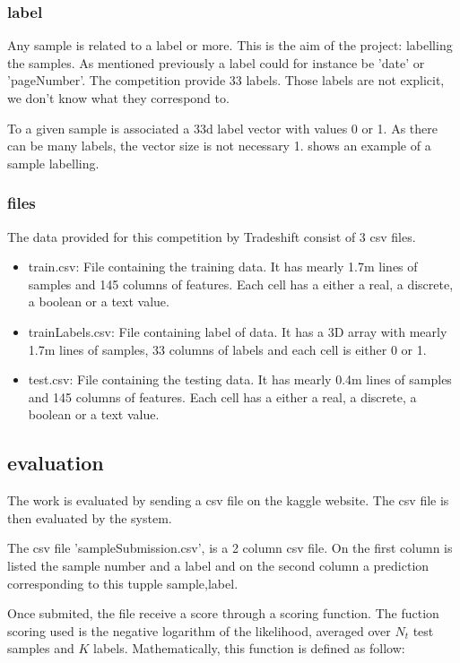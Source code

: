 		\subsubsection{label}
			Any sample is related to a label or more. This is the aim of the project: labelling the samples. As mentioned previously a label could for instance be 'date' or 'pageNumber'. The competition provide 33 labels. Those labels are not explicit, we don't know what they correspond to.

			To a given sample is associated a 33d label vector with values 0 or 1. As there can be many labels, the vector size is not necessary 1.  shows an example of a sample labelling.


		\subsubsection{files}
			The data provided for this competition by Tradeshift consist of 3 csv files. 

			\begin{itemize}
				\item train.csv: File containing the training data. It has mearly 1.7m lines of samples and 145 columns of features. Each cell has a either a real, a discrete, a boolean or a text value.
				\item trainLabels.csv: File containing label of data. It has a 3D array with mearly 1.7m lines of samples, 33 columns of labels and each cell is either 0 or 1.
				\item test.csv: File containing the testing data. It has mearly 0.4m lines of samples and 145 columns of features. Each cell has a either a real, a discrete, a boolean or a text value.
			\end{itemize}



	\subsection{evaluation}
		The work is evaluated by sending a csv file on the kaggle website. The csv file is then evaluated by the system.

		The csv file 'sampleSubmission.csv', is a 2 column csv file. On the first column is listed the sample number and a label and on the second column a prediction corresponding to this tupple {sample,label}.

		Once submited, the file receive a score through a scoring function. The fuction scoring used is the negative logarithm of the likelihood, averaged over $N_t$ test samples and $K$ labels.
		Mathematically, this function is defined as follow:

